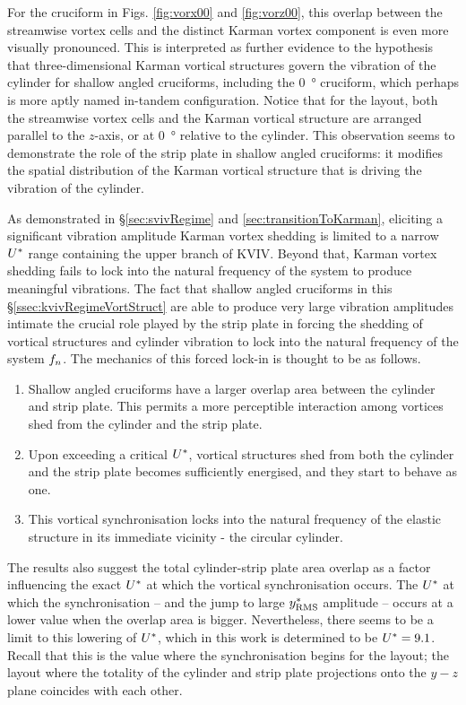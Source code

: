 \documentclass[oneside]{utmthesis}
\begin{document}
For the \angon{} cruciform in Figs. \ref{fig:vorx00} and \ref{fig:vorz00}, this overlap between the streamwise vortex cells and the distinct Karman vortex component is even more visually pronounced. This is interpreted as further evidence to the hypothesis that three-dimensional Karman vortical structures govern the vibration of the cylinder for shallow angled cruciforms, including the \SI{0}{\degree} cruciform, which perhaps is more aptly named in-tandem configuration. Notice that for the \angon{} layout, both the streamwise vortex cells and the Karman vortical structure are arranged parallel to the $z$-axis, or at \SI{0}{\degree} relative to the cylinder. This observation seems to demonstrate the role of the strip plate in shallow angled cruciforms: it modifies the spatial distribution of the Karman vortical structure that is driving the vibration of the cylinder.

As demonstrated in \S\ref{sec:svivRegime} and \ref{sec:transitionToKarman}, eliciting a significant vibration amplitude Karman vortex shedding is limited to a narrow $U^{*}$ range containing the upper branch of KVIV. Beyond that, Karman vortex shedding fails to lock into the natural frequency of the system to produce meaningful vibrations. The fact that shallow angled cruciforms in this \S\ref{ssec:kvivRegimeVortStruct} are able to produce very large vibration amplitudes intimate the crucial role played by the strip plate in forcing the shedding of vortical structures and cylinder vibration to lock into the natural frequency of the system $f_{n}$. The mechanics of this forced lock-in is thought to be as follows.

\begin{enumerate}
  \item Shallow angled cruciforms have a larger overlap area between the cylinder and strip plate. This permits a more perceptible interaction among vortices shed from the cylinder and the strip plate.
  \item Upon exceeding a critical $U^{*}$, vortical structures shed from both the cylinder and the strip plate becomes sufficiently energised, and they start to behave as one.
  \item This vortical synchronisation locks into the natural frequency of the elastic structure in its immediate vicinity - the circular cylinder.
\end{enumerate}

\noindent The results also suggest the total cylinder-strip plate area overlap as a factor influencing the exact $U^{*}$ at which the vortical synchronisation occurs. The $U^{*}$ at which the synchronisation -- and the jump to large $y^{*}_{\text{RMS}}$ amplitude -- occurs at a lower value when the overlap area is bigger. Nevertheless, there seems to be a limit to this lowering of $U^{*}$, which in this work is determined to be $U^{*} = 9.1$. Recall that this is the value where the synchronisation begins for the \angon{} layout; the layout where the totality of the cylinder and strip plate projections onto the $y-z$ plane coincides with each other.
\end{document}
